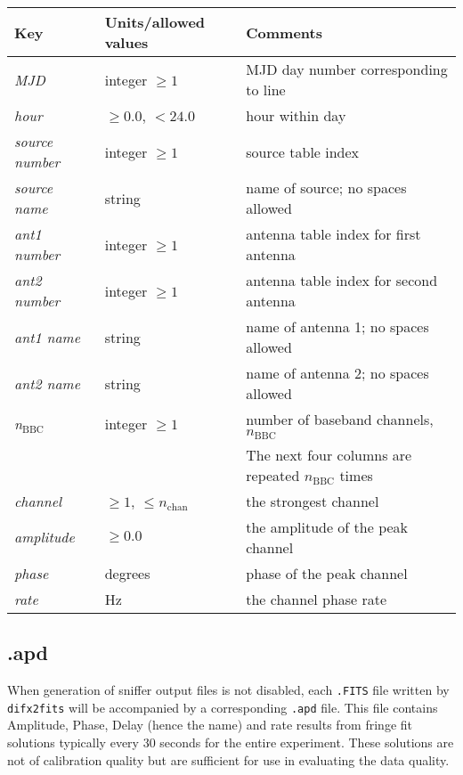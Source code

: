 \begin{center}
\begin{tabular}{l l l}
\hline
Key & Units/allowed values & Comments \\
\hline
{\it MJD}           & integer $\ge 1$    & MJD day number corresponding to line \\
{\it hour}          & $\ge 0.0$, $< 24.0$ & hour within day \\
{\it source number} & integer $\ge 1$    & source table index \\
{\it source name}   & string             & name of source; no spaces allowed \\
{\it ant1 number}   & integer $\ge 1$    & antenna table index for first antenna \\
{\it ant2 number}   & integer $\ge 1$    & antenna table index for second antenna \\
{\it ant1 name}     & string             & name of antenna 1; no spaces allowed \\
{\it ant2 name}     & string             & name of antenna 2; no spaces allowed \\
{\it n}$_{\mathrm{BBC}}$  & integer $\ge 1$    & number of baseband channels, $n_{\mathrm{BBC}}$ \\
& & The next four columns are repeated $n_{\mathrm{BBC}}$ times \\
\hline
{\it channel}       & $\ge 1$, $\le n_\mathrm{chan}$            & the strongest channel \\
{\it amplitude}     & $\ge 0.0$          & the amplitude of the peak channel \\
{\it phase}         & degrees            & phase of the peak channel \\
{\it rate}          & Hz                 & the channel phase rate \\
\hline
\end{tabular}
\end{center}







\subsection{.apd} \label{sec:apd}

When generation of sniffer output files is not disabled, each {\tt .FITS} file written by {\tt difx2fits} will be accompanied by a corresponding {\tt .apd} file. 
This file contains Amplitude, Phase, Delay (hence the name) and rate results from fringe fit solutions typically every 30 seconds for the entire experiment.
These solutions are not of calibration quality but are sufficient for use in evaluating the data quality.

